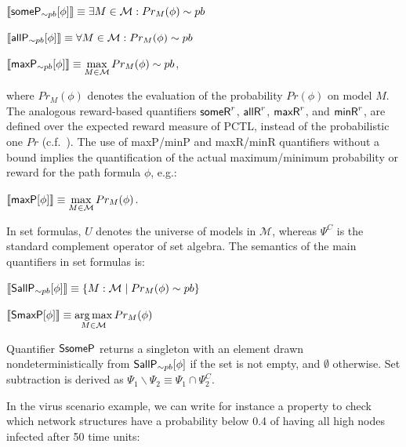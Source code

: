 \documentclass[10pt,journal,compsoc]{IEEEtran}
\DeclareMathOperator*{\argmax}{arg\,max}
\begin{document}
\begin{center}
$ \llbracket {\sf someP}_{\sim pb} [\phi] \rrbracket \equiv  \exists M \in \mathcal{M} : Pr_M(\phi) \sim pb $

\smallskip
$ \llbracket {\sf allP}_{\sim pb} [\phi] \rrbracket \equiv  \forall M \in \mathcal{M} : Pr_{M}(\phi) \sim pb $

\smallskip
$ \llbracket {\sf maxP}_{\sim pb} [\phi] \rrbracket \equiv  {\displaystyle \max_{M \in \mathcal{M}} Pr_{M}(\phi)} \sim pb$,
\end{center}
\noindent where  $Pr_{M}(\phi)$ denotes the evaluation of the probability $Pr(\phi)$ on model $M$. 
The analogous reward-based quantifiers ${\sf someR}^r$, ${\sf allR}^r$, ${\sf maxR}^r$, and ${\sf minR}^r$, are defined over the expected reward measure of PCTL, instead of the probabilistic one $Pr$ (c.f.~\cite{DBLP:conf/sfm/KwiatkowskaNP07}). 
The use of {\sf maxP/minP} and {\sf maxR/minR} quantifiers without a bound implies the quantification of the actual maximum/minimum probability or reward for the path formula $\phi$, e.g.:
\begin{center}
$ \llbracket {\sf maxP} [\phi] \rrbracket \equiv {\displaystyle \max_{M \in \mathcal{M}} Pr_{M}(\phi)}$.
\end{center}



In set formulas, $U$ denotes the universe of models in $\mathcal M$, whereas $\Psi^C$ is the standard complement operator of set algebra. The semantics of the main quantifiers in set formulas is:

\begin{center}
$ \llbracket {\sf SallP}_{\sim pb} [\phi] \rrbracket \equiv  \{ M : \mathcal{M} \; | \; Pr_{M}(\phi) \sim pb \}$

\smallskip
$ \llbracket {\sf SmaxP} [\phi] \rrbracket \equiv  {\displaystyle \argmax_{M \in \mathcal{M}} Pr_{M}(\phi)}$
\end{center}

Quantifier ${\sf SsomeP}$ returns a singleton with an element drawn nondeterministically from ${\sf SallP}_{\sim pb} [\phi]$ if the set is not empty, and $\emptyset$ otherwise.
 Set subtraction is derived as $\Psi_1 \backslash \Psi_2 \equiv \Psi_1 \cap \Psi_2^C$.

In the virus scenario example, we can write for instance a property to check which network structures have a probability below 0.4 of having all high nodes infected after 50 time units:
\end{document}

